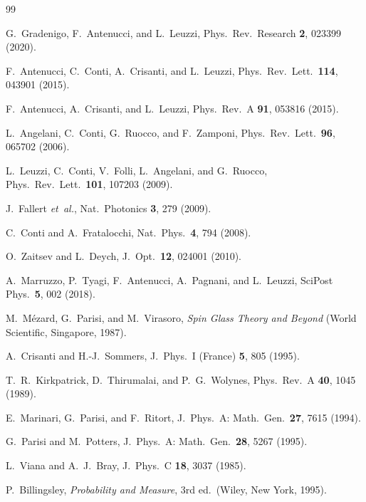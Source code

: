 \documentclass[11pt,a4paper]{article}
\begin{document}
\bigskip
\begin{thebibliography}{99}

  G.~Gradenigo, F.~Antenucci, and L.~Leuzzi,
  Phys.\ Rev.\ Research \textbf{2}, 023399 (2020).

  F.~Antenucci, C.~Conti, A.~Crisanti, and L.~Leuzzi,
  Phys.\ Rev.\ Lett.\ \textbf{114}, 043901 (2015).

  F.~Antenucci, A.~Crisanti, and L.~Leuzzi,
  Phys.\ Rev.\ A \textbf{91}, 053816 (2015).

  L.~Angelani, C.~Conti, G.~Ruocco, and F.~Zamponi,
  Phys.\ Rev.\ Lett.\ \textbf{96}, 065702 (2006).

  L.~Leuzzi, C.~Conti, V.~Folli, L.~Angelani, and G.~Ruocco,
  Phys.\ Rev.\ Lett.\ \textbf{101}, 107203 (2009).

  J.~Fallert \textit{et~al.},
  Nat.\ Photonics \textbf{3}, 279 (2009).

  C.~Conti and A.~Fratalocchi,
  Nat.\ Phys.\ \textbf{4}, 794 (2008).

  O.~Zaitsev and L.~Deych,
  J.~Opt.\ \textbf{12}, 024001 (2010).

  A.~Marruzzo, P.~Tyagi, F.~Antenucci, A.~Pagnani, and L.~Leuzzi,
  SciPost Phys.\ \textbf{5}, 002 (2018).

  M.~M\'ezard, G.~Parisi, and M.~Virasoro,
  \textit{Spin Glass Theory and Beyond}
  (World Scientific, Singapore, 1987).

  A.~Crisanti and H.-J.~Sommers,
  J.\ Phys.\ I (France) \textbf{5}, 805 (1995).

  T.~R.~Kirkpatrick, D.~Thirumalai, and P.~G.~Wolynes,
  Phys.\ Rev.\ A \textbf{40}, 1045 (1989).

  E.~Marinari, G.~Parisi, and F.~Ritort,
  J.~Phys.\ A: Math.\ Gen.\ \textbf{27}, 7615 (1994).

  G.~Parisi and M.~Potters,
  J.~Phys.\ A: Math.\ Gen.\ \textbf{28}, 5267 (1995).

  L.~Viana and A.~J.~Bray,
  J.~Phys.\ C \textbf{18}, 3037 (1985).

  P.~Billingsley,
  \textit{Probability and Measure}, 3rd ed.\
  (Wiley, New York, 1995).

\end{thebibliography}
\end{document}
